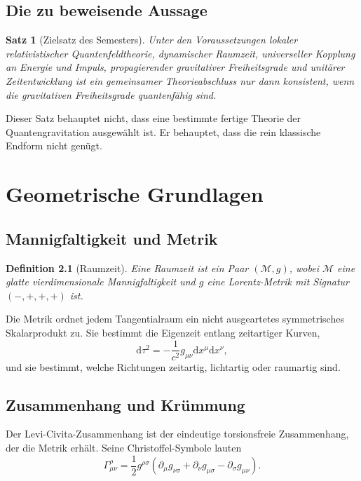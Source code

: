 \documentclass[11pt,a4paper,openany]{book}
\newtheorem{definition}{Definition}[chapter]
\newtheorem{satz}{Satz}[chapter]
\theoremstyle{remark}
\newcommand{\M}{\mathcal{M}}
\newcommand{\diff}{\mathrm{d}}
\begin{document}
\section{Die zu beweisende Aussage}
\begin{satz}[Zielsatz des Semesters]
Unter den Voraussetzungen lokaler relativistischer Quantenfeldtheorie, dynamischer Raumzeit, universeller Kopplung an Energie und Impuls, propagierender gravitativer Freiheitsgrade und unitärer Zeitentwicklung ist ein gemeinsamer Theorieabschluss nur dann konsistent, wenn die gravitativen Freiheitsgrade quantenfähig sind.
\end{satz}

Dieser Satz behauptet nicht, dass eine bestimmte fertige Theorie der Quantengravitation ausgewählt ist. Er behauptet, dass die rein klassische Endform nicht genügt.

\chapter{Geometrische Grundlagen}
\section{Mannigfaltigkeit und Metrik}
\begin{definition}[Raumzeit]
Eine Raumzeit ist ein Paar $(\M,g)$, wobei $\M$ eine glatte vierdimensionale Mannigfaltigkeit und $g$ eine Lorentz-Metrik mit Signatur $(-,+,+,+)$ ist.
\end{definition}

Die Metrik ordnet jedem Tangentialraum ein nicht ausgeartetes symmetrisches Skalarprodukt zu. Sie bestimmt die Eigenzeit entlang zeitartiger Kurven,
\begin{equation}
\diff\tau^2=-\frac{1}{c^2}g_{\mu\nu}\diff x^\mu\diff x^\nu,
\end{equation}
und sie bestimmt, welche Richtungen zeitartig, lichtartig oder raumartig sind.

\section{Zusammenhang und Krümmung}
Der Levi-Civita-Zusammenhang ist der eindeutige torsionsfreie Zusammenhang, der die Metrik erhält. Seine Christoffel-Symbole lauten
\begin{equation}
\Gamma^\rho_{\mu\nu}=\frac12 g^{\rho\sigma}\left(\partial_\mu g_{\nu\sigma}+\partial_\nu g_{\mu\sigma}-\partial_\sigma g_{\mu\nu}\right).
\end{equation}
\end{document}
